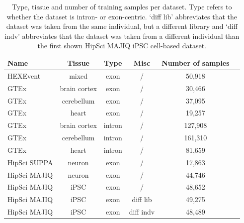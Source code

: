 \begin{table}[h!]
	\centering
	\begin{tabular}{l | c c c | c c} 
		\toprule
		Name & Tissue & Type & Misc & Number of samples\\
		\toprule
		HEXEvent & mixed & exon & / & 50,918 \\
		\hline
		GTEx & brain cortex & exon & / & 30,466\\
		GTEx & cerebellum & exon & / & 37,095\\
		GTEx & heart & exon & / & 19,257\\
		\hline
		GTEx & brain cortex & intron & / & 127,908\\
		GTEx & cerebellum & intron & / & 161,310\\
		GTEx & heart & intron & / & 81,659\\
		\hline
		HipSci SUPPA & neuron & exon & / & 17,863 \\
		\hline
		HipSci MAJIQ & neuron & exon & / & 44,746 \\
		HipSci MAJIQ & iPSC & exon & / & 48,652 \\
		HipSci MAJIQ & iPSC & exon & diff lib & 49,275 \\
		HipSci MAJIQ & iPSC & exon & diff indv & 48,489 \\
		
		\hline
		
	\end{tabular}
	\caption{Type, tissue and number of training samples per dataset. Type refers to whether the dataset is intron- or exon-centric. `diff lib' abbreviates that the dataset was taken from the same individual, but a different library and `diff indv' abbreviates that the dataset was taken from a different individual than the first shown HipSci MAJIQ iPSC cell-based dataset. 
	}
	\label{table:datasets}
\end{table}

